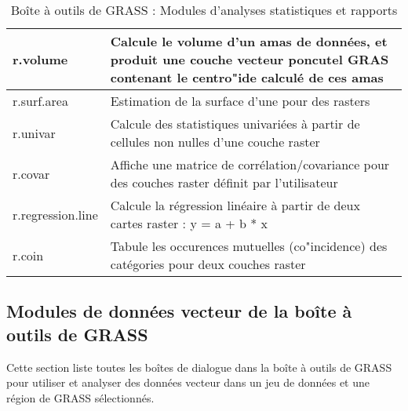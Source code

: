 \begin{table}[H]
\begin{tabular}{|p{4cm}|p{10cm}|}
  \hline r.volume & Calcule le volume d'un amas de données, et produit une couche vecteur poncutel GRAS contenant le centro"ide calculé de ces amas \\
  \hline r.surf.area & Estimation de la surface d'une pour des rasters \\
  \hline r.univar & Calcule des statistiques univariées à partir de cellules non nulles d'une couche raster\\
  \hline r.covar & Affiche une matrice de corrélation/covariance pour des couches raster définit par l'utilisateur\\
  \hline r.regression.line & Calcule la régression linéaire à partir de deux cartes raster : y = a + b * x \\
  \hline r.coin & Tabule les occurences mutuelles (co"incidence) des catégories pour deux couches raster\\
\hline
\end{tabular}
\caption{Boîte à outils de GRASS : Modules d'analyses statistiques et rapports}
\end{table}


\subsection{Modules de données vecteur de la boîte à outils de GRASS}

Cette section liste toutes les boîtes de dialogue dans la boîte à outils de GRASS pour utiliser et analyser des données vecteur dans un jeu de données et une région de GRASS sélectionnés.

